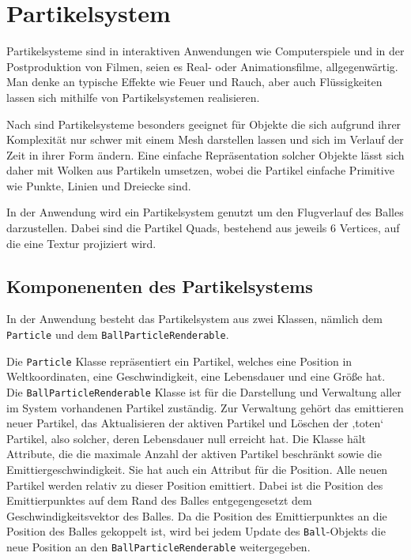 \section{Partikelsystem}
\label{Kapitel_2_-_Unterkapitel_2}
%
Partikelsysteme sind in interaktiven Anwendungen wie Computerspiele und in der Postproduktion von Filmen, seien es Real- oder Animationsfilme, allgegenwärtig.
Man denke an typische Effekte wie Feuer und Rauch, aber auch Flüssigkeiten lassen sich mithilfe von Partikelsystemen realisieren.

Nach \cite{reeves:particle_systems} sind Partikelsysteme besonders geeignet für Objekte die sich aufgrund ihrer Komplexität nur schwer mit einem Mesh darstellen lassen und sich im Verlauf der Zeit in ihrer Form ändern. Eine einfache Repräsentation solcher Objekte lässt sich daher mit Wolken aus Partikeln umsetzen, wobei die Partikel einfache Primitive wie Punkte, Linien und Dreiecke sind\cite{reeves:particle_systems}.

In der Anwendung wird ein Partikelsystem genutzt um den Flugverlauf des Balles darzustellen. Dabei sind die Partikel Quads, bestehend aus jeweils 6 Vertices, auf die eine Textur projiziert wird.

\subsection{Komponenenten des Partikelsystems}
\label{Kapitel_2_-_Unterkapitel_2.1}
%
In der Anwendung besteht das Partikelsystem aus zwei Klassen, nämlich dem {\texttt{Particle}} und dem {\texttt{BallParticleRenderable}}.

Die {\texttt{Particle}} Klasse repräsentiert ein Partikel, welches eine Position in Weltkoordinaten, eine Geschwindigkeit, eine Lebensdauer und eine Größe hat. 
Die {\texttt{BallParticleRenderable}} Klasse ist für die Darstellung und Verwaltung aller im System vorhandenen Partikel zuständig. Zur Verwaltung gehört das emittieren neuer Partikel, das Aktualisieren der aktiven Partikel und Löschen der ‚toten‘ Partikel, also solcher, deren Lebensdauer null erreicht hat. Die Klasse hält Attribute, die die maximale Anzahl der aktiven Partikel beschränkt sowie die Emittiergeschwindigkeit.  Sie hat auch ein Attribut für die Position. Alle neuen Partikel werden relativ zu dieser Position emittiert. Dabei ist die Position des Emittierpunktes auf dem Rand des Balles entgegengesetzt dem Geschwindigkeitsvektor des Balles. Da die Position des Emittierpunktes an die Position des Balles gekoppelt ist, wird bei jedem Update des {\texttt{Ball}}-Objekts die neue Position an den {\texttt{BallParticleRenderable}} weitergegeben.

